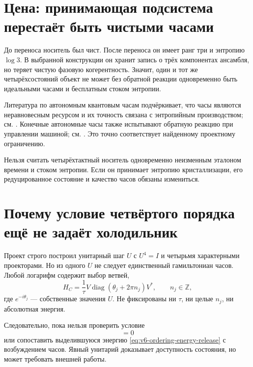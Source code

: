 \section{Цена: принимающая подсистема перестаёт быть чистыми часами}

До переноса носитель был чист. После переноса он имеет ранг три и энтропию
$\log3$. В выбранной конструкции он хранит запись о трёх компонентах
ансамбля, но теряет чистую фазовую когерентность. Значит, один и тот же
четырёхсостояний объект не может без обратной реакции одновременно быть
идеальными часами и бесплатным стоком энтропии.

Литература по автономным квантовым часам подчёркивает, что часы являются
неравновесным ресурсом и их точность связана с энтропийным производством;
см. . Конечные автономные часы также испытывают
обратную реакцию при управлении машиной; см. .
Это точно соответствует найденному проектному ограничению.

\begin{nogocriterion}
Нельзя считать четырёхтактный носитель одновременно неизменным эталоном
времени и стоком энтропии. Если он принимает энтропию кристаллизации, его
редуцированное состояние и качество часов обязаны измениться.
\end{nogocriterion}

\section{Почему условие четвёртого порядка ещё не задаёт холодильник}

Проект строго построил унитарный шаг $U$ с $U^4=I$ и четырьмя характерными
проекторами. Но из одного $U$ не следует единственный гамильтониан часов.
Любой логарифм содержит выбор ветвей,
\begin{equation}
 H_C=\frac1{\tau}
 V\operatorname{diag}(\theta_j+2\pi n_j)V^*,
 \qquad n_j\in\mathbb Z,
 \label{eq:v6-clock-logarithm-ambiguity}
\end{equation}
где $e^{-i\theta_j}$ --- собственные значения $U$.
Не фиксированы ни $\tau$, ни целые $n_j$, ни абсолютная энергия.

Следовательно, пока нельзя проверить условие
\begin{equation}
 [W,H_S+H_C+H_{\rm int}]=0
\end{equation}
или сопоставить выделившуюся энергию
\eqref{eq:v6-ordering-energy-release} с возбуждением часов. Явный унитарий
доказывает доступность состояния, но может требовать внешней работы.

